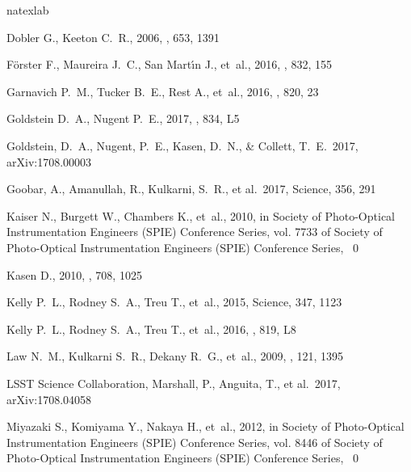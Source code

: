 \documentclass[useAMS,usenatbib,twocolumn]{mnras}
\begin{document}
\begin{thebibliography}{26}
\expandafter\ifx\csname natexlab\endcsname\relax\def\natexlab#1{#1}\fi

{Dobler} G., {Keeton} C.~R., 2006, \apj, 653, 1391

 {F{\"o}rster} F., {Maureira} J.~C.,
  {San Mart{\'{\i}}n} J., et~al., 2016, \apj, 832, 155

{Garnavich} P.~M., {Tucker} B.~E., {Rest} A., et~al., 2016, \apj, 820, 23

{Goldstein} D.~A., {Nugent} P.~E., 2017, \apjl, 834, L5

 Goldstein, D.~A., Nugent,
  P.~E., Kasen, D.~N., \& Collett, T.~E.\ 2017, arXiv:1708.00003

 Goobar, A., Amanullah, R.,
  Kulkarni, S.~R., et al.\ 2017, Science, 356, 291

 {Kaiser} N., {Burgett} W., {Chambers} K., et~al.,
  2010, in { Society of Photo-Optical Instrumentation Engineers (SPIE)
    Conference Series\/}, vol.  7733 of { Society of Photo-Optical
    Instrumentation Engineers (SPIE) Conference Series\/}, ~0

{Kasen} D., 2010, \apj, 708, 1025

{Kelly} P.~L., {Rodney} S.~A., {Treu} T., et~al., 2015, Science, 347, 1123

{Kelly} P.~L., {Rodney} S.~A., {Treu} T., et~al., 2016, \apjl, 819, L8

{Law} N.~M., {Kulkarni} S.~R., {Dekany} R.~G., et~al., 2009, \pasp, 121, 1395

 LSST Science
  Collaboration, Marshall, P., Anguita, T., et al.\ 2017,
  arXiv:1708.04058

{Miyazaki} S., {Komiyama} Y., {Nakaya} H., et~al., 2012, in { Society of
  Photo-Optical Instrumentation Engineers (SPIE) Conference Series\/}, vol.
  8446 of { Society of Photo-Optical Instrumentation Engineers (SPIE)
  Conference Series\/}, ~0


\end{thebibliography}
\end{document}

